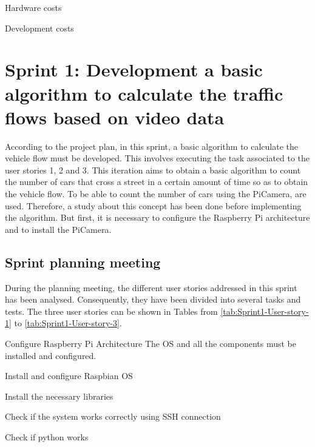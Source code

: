 \begin{table}[hp]
	\centering
	{\small
		
	}
	\caption{Hardware costs}
	\label{tab:Hardware-Costs}
\end{table}

\begin{table}[hp]
	\centering
	{\small
		
	}
	\caption{Development costs}
	\label{tab:Development-Costs}
\end{table}



\section{Sprint 1: Development a basic algorithm to calculate the traffic flows based on video data}
According to the project plan, in this sprint, a basic algorithm to calculate the vehicle flow must be developed. This involves executing the task associated to the user stories 1, 2 and 3. This iteration aims to obtain a basic algorithm to count the number of cars that cross a street in a certain amount of time so as to obtain the vehicle flow.  To be able to count the number of cars using the PiCamera,  are used. Therefore, a study about this concept has been done before implementing the algorithm. But first, it is necessary to configure the Raspberry Pi architecture and to install the PiCamera. 

\subsection{Sprint planning meeting}
During the planning meeting, the different user stories addressed in this sprint has been analysed. Consequently, they have been divided into several tasks and tests. The three user stories can be shown in Tables from \ref{tab:Sprint1-User-story-1} to \ref{tab:Sprint1-User-story-3}.

{Configure Raspberry Pi Architecture}
{The \ac{OS} and all the components must be installed and configured.}
{	\item Install and configure Raspbian \ac{OS}
	\item Install the necessary libraries
}{	\item Check if the system works correctly using SSH connection
	\item Check if python works
}

